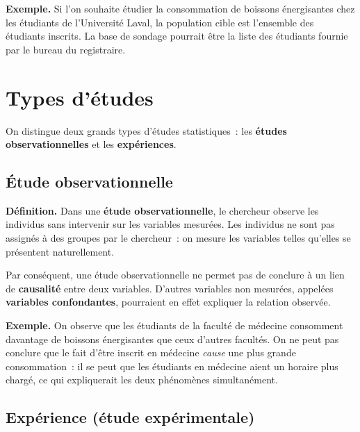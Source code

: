 \documentclass[11pt,french]{article}
\begin{document}
\textbf{Exemple.} Si l'on souhaite étudier la consommation de boissons énergisantes chez les
étudiants de l'Université Laval, la population cible est l'ensemble des étudiants inscrits.
La base de sondage pourrait être la liste des étudiants fournie par le bureau du registraire.

\section{Types d'études}

On distingue deux grands types d'études statistiques~: les \textbf{études observationnelles}
et les \textbf{expériences}.

\subsection{Étude observationnelle}

\textbf{Définition.} Dans une \textbf{étude observationnelle}, le chercheur observe les
individus sans intervenir sur les variables mesurées. Les individus ne sont pas assignés à
des groupes par le chercheur~: on mesure les variables telles qu'elles se présentent
naturellement.

Par conséquent, une étude observationnelle ne permet pas de conclure à un lien de
\textbf{causalité} entre deux variables. D'autres variables non mesurées, appelées
\textbf{variables confondantes}, pourraient en effet expliquer la relation observée.

\textbf{Exemple.} On observe que les étudiants de la faculté de médecine consomment davantage
de boissons énergisantes que ceux d'autres facultés. On ne peut pas conclure que le fait
d'être inscrit en médecine \emph{cause} une plus grande consommation~: il se peut que les
étudiants en médecine aient un horaire plus chargé, ce qui expliquerait les deux phénomènes
simultanément.

\subsection{Expérience (étude expérimentale)}
\end{document}
